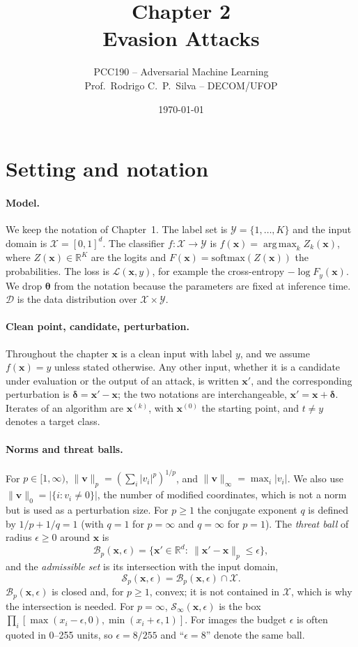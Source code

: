 \documentclass[10pt,a4paper]{extarticle}
\title{Chapter 2\\Evasion Attacks}
\author{PCC190 -- Adversarial Machine Learning\\Prof.\ Rodrigo C.\ P.\ Silva -- DECOM/UFOP}
\date{\today}
\theoremstyle{definition}
\newcommand{\R}{\mathbb{R}}
\newcommand{\X}{\mathcal{X}}
\newcommand{\Y}{\mathcal{Y}}
\newcommand{\D}{\mathcal{D}}
\newcommand{\Loss}{\mathcal{L}}
\newcommand{\x}{\mathbf{x}}
\newcommand{\xadv}{\mathbf{x}'}
\newcommand{\bdelta}{\boldsymbol{\delta}}
\newcommand{\btheta}{\boldsymbol{\theta}}
\newcommand{\B}{\mathcal{B}}
\DeclareMathOperator*{\argmax}{arg\,max}
\begin{document}
\maketitle
\thispagestyle{fancy}
\tableofcontents

\section*{Setting and notation}

\paragraph{Model.} We keep the notation of Chapter~1. The label set is \(\Y=\{1,\dots,K\}\) and the input domain is \(\X=[0,1]^d\). The classifier \(f:\X\to\Y\) is \(f(\x)=\argmax_k Z_k(\x)\), where \(Z(\x)\in\R^K\) are the logits and \(F(\x)=\mathrm{softmax}(Z(\x))\) the probabilities. The loss is \(\Loss(\x,y)\), for example the cross-entropy \(-\log F_y(\x)\). We drop \(\btheta\) from the notation because the parameters are fixed at inference time. \(\D\) is the data distribution over \(\X\times\Y\).

\paragraph{Clean point, candidate, perturbation.} Throughout the chapter \(\x\) is a clean input with label \(y\), and we assume \(f(\x)=y\) unless stated otherwise. Any other input, whether it is a candidate under evaluation or the output of an attack, is written \(\xadv\), and the corresponding perturbation is \(\bdelta=\xadv-\x\); the two notations are interchangeable, \(\xadv=\x+\bdelta\). Iterates of an algorithm are \(\x^{(k)}\), with \(\x^{(0)}\) the starting point, and \(t\neq y\) denotes a target class.

\paragraph{Norms and threat balls.} For \(p\in[1,\infty)\), \(\|\mathbf{v}\|_p=(\sum_i|v_i|^p)^{1/p}\), and \(\|\mathbf{v}\|_\infty=\max_i|v_i|\). We also use \(\|\mathbf{v}\|_0=|\{i: v_i\neq0\}|\), the number of modified coordinates, which is not a norm but is used as a perturbation size. For \(p\ge1\) the conjugate exponent \(q\) is defined by \(1/p+1/q=1\) (with \(q=1\) for \(p=\infty\) and \(q=\infty\) for \(p=1\)). The \emph{threat ball} of radius \(\epsilon\ge0\) around \(\x\) is
\[
\B_p(\x,\epsilon)=\{\xadv\in\R^d:\ \|\xadv-\x\|_p\le\epsilon\},
\]
and the \emph{admissible set} is its intersection with the input domain,
\[
\mathcal{S}_p(\x,\epsilon)=\B_p(\x,\epsilon)\cap\X .
\]
\(\B_p(\x,\epsilon)\) is closed and, for \(p\ge1\), convex; it is not contained in \(\X\), which is why the intersection is needed. For \(p=\infty\), \(\mathcal{S}_\infty(\x,\epsilon)\) is the box \(\prod_i[\max(x_i-\epsilon,0),\min(x_i+\epsilon,1)]\). For images the budget \(\epsilon\) is often quoted in 0--255 units, so \(\epsilon=8/255\) and \enquote{\(\epsilon=8\)} denote the same ball.
\end{document}
